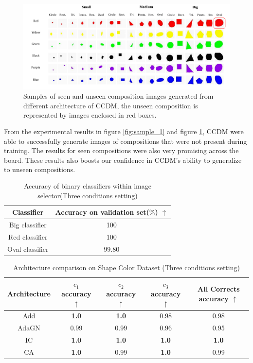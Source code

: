 \begin{figure} [H]
    \centering
    \includegraphics[width=1\linewidth]{figures/ShapeColor2.pdf}
    \caption{Samples of seen and unseen composition images generated from different architecture of CCDM, the unseen composition is represented by images enclosed in red boxes.}
    \label{fig:sample_3}
\end{figure}

From the experimental results in figure \ref{fig:sample_1} and figure \ref{fig:sample_3}, CCDM were able to successfully generate images of compositions that were not present during training. The results for seen compositions were also very promising across the board. These results also boosts our confidence in CCDM's ability to generalize to unseen compositions.

\begin{table} [H]
    \centering
    \begin{tabular}{cc}
         Classifier & Accuracy on validation set($\%$) $\uparrow$ \\
         \hline
         Big classifier & 100 \\
         Red classifier & 100 \\
         Oval classifier & 99.80 \\
    \end{tabular}
    \caption{Accuracy of binary classifiers within image selector(Three conditions setting)}
    \label{ShapeColorBinAccTri}
\end{table}

\begin{table} [H]
    \centering
    \begin{tabular}{ccccc}
         Architecture & $c_1$ accuracy $\uparrow$ & $c_2$ accuracy $\uparrow$ & $c_3$ accuracy $\uparrow$ & All Corrects accuracy $\uparrow$ \\
         \hline
         Add  & \textbf{1.0} & \textbf{1.0} & 0.98 & 0.98\\
         AdaGN & 0.99 & 0.99 & 0.96 & 0.95\\
         IC & \textbf{1.0} & \textbf{1.0} & \textbf{1.0} & \textbf{1.0}\\
         CA & \textbf{1.0} & 0.99 & \textbf{1.0} & 0.99\\
    \end{tabular}
    \caption{Architecture comparison on Shape Color Dataset (Three conditions setting)}
    \label{ShapeColorTriAcc}
\end{table}


